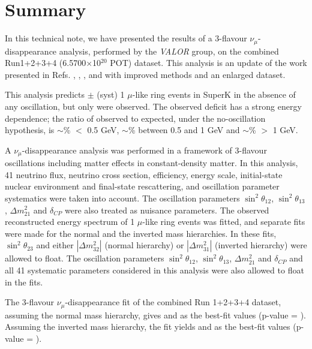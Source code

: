 \clearpage


\section {Summary}
\label{sec:summary}

In this technical note,
we have presented the results of a 3-flavour $\nu_{\mu}$-disappearance analysis,
performed by the {\em VALOR} group,
on the combined Run1+2+3+4 (6.5700$\times$10$^{20}$ POT) dataset.
This analysis is an update of the work presented in
Refs. \cite{OurRun1DisappAnalysis}, 
\cite{OurRun12DisappAnalysis}, 
\cite{OurRun12DisappAnalysis3Flavour},
\cite{OurRun123DisappAnalysis3Flavour} and 
\cite{OurRun1234aDisappAnalysis3Flavour}
with improved methods and an enlarged dataset.

This analysis predicts \NskNoOscExpectation $\pm$ \NskNoOscExpectationError (syst)
1 $\mu$-like ring events in SuperK in the absence of any oscillation,
but only \NskObserved were observed. The observed deficit has a strong energy dependence;
the ratio of observed to expected, under the no-oscillation hypothesis, is
$\sim$\NskNoOscRatioLow\% $<$ 0.5 GeV,
$\sim$\NskNoOscRatioMid\% between 0.5 and 1 GeV and
$\sim$\NskNoOscRatioHig\% $>$ 1 GeV.

A $\nu_{\mu}$-disappearance analysis was performed
in a framework of 3-flavour oscillations including matter effects in constant-density matter.
In this analysis, 41 neutrino flux, neutrino cross section,
efficiency, energy scale, initial-state nuclear environment and final-state rescattering,
and oscillation parameter systematics were taken into account. The oscillation parameters 
$\sin^{2}\theta_{12}$, $\sin^{2}\theta_{13}$, $\Delta m^{2}_{21}$ and $\delta_{CP}$ were 
also treated as nuisance parameters. 
The observed reconstructed energy spectrum of 1 $\mu$-like ring events was fitted,
and separate fits were made for the normal and the inverted mass hierarchies. In these fits,
$\sin^{2}\theta_{23}$ and either $|\Delta m^{2}_{32}|$ (normal hierarchy) or $|\Delta m^{2}_{31}|$ (inverted hierarchy)
were allowed to float.
The oscillation parameters $\sin^{2}\theta_{12}$, $\sin^{2}\theta_{13}$, $\Delta m^{2}_{21}$ and $\delta_{CP}$
and all 41 systematic parameters considered in this analysis were also allowed to float in the fits.

The 3-flavour $\nu_{\mu}$-disappearance fit of the combined Run 1+2+3+4 dataset,
assuming the normal mass hierarchy,
gives
\resultNormalDmsq and \resultNormalMixing
as the best-fit values (p-value = \resultNormalPvalue).
Assuming the inverted mass hierarchy, the fit yields
\resultInvertedDmsq and \resultInvertedMixing
as the best-fit values (p-value = \resultInvertedPvalue).

